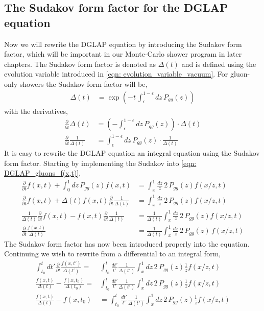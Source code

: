 \documentclass[main.tex]{subfiles}
\begin{document}
\subsection{The Sudakov form factor for the DGLAP equation}
Now we will rewrite the DGLAP equation by introducing the Sudakov form factor, which will be important in our Monte-Carlo shower program in later chapters. The Sudakov form factor is denoted as \(\Delta(t)\) and is defined using the evolution variable introduced in \autoref{eqn: evolution_variable_vacuum}. For gluon-only showers the Sudakov form factor will be, 
\begin{align}\label{eqn: sudakov_form_factor_dasguptalike}
    \Delta (t) &= \exp\left(-t\, \int_{\epsilon}^{1-\epsilon}dz \, P_{gg}(z)\right) 
\end{align}
with the derivatives,
\begin{align}
    \frac{\partial}{\partial t} \Delta (t) &= (- \int_{\epsilon}^{1-\epsilon} dz\, P_{gg}(z) )\cdot  \Delta(t) \nonumber\\
    \frac{\partial}{\partial t} \frac{1}{\Delta(t)}&= \int_{\epsilon}^{1-\epsilon} dz\, P_{gg}(z) \cdot  \frac{1}{\Delta(t)}
\end{align}
It is easy to rewrite the DGLAP equation an integral equation using the Sudakov form factor.
Starting by implementing the Sudakov into \autoref{eqn: DGLAP_gluons_f(x,t)},
\begin{align}
    \frac{\partial}{\partial t} f(x,t) + \int_{0}^{1} dz \, P_{gg}(z) f(x,t) &= \int_{x}^{1} \frac{dz}{z} \,2\, P_{gg}(z) f(x/z ,t) \nonumber \\
    \frac{\partial}{\partial t} f(x,t) + \Delta(t) f(x,t) \frac{\partial}{\partial t} \frac{1}{\Delta(t)} &= \int_{x}^{1} \frac{dz}{z} \,2\, P_{gg}(z) f(x/z ,t) \nonumber \\
    \frac{1}{\Delta(t)} \frac{\partial}{\partial t} f(x,t) - f(x,t) \frac{\partial}{\partial t} \frac{1}{\Delta(t)} &= \frac{1}{\Delta(t)} \int_{x}^{1} \frac{dz}{z} \,2\, P_{gg}(z) f(x/z ,t) \nonumber \\
    \frac{\partial }{\partial t} \frac{f(x,t)}{\Delta (t)} &= \frac{1}{\Delta(t)} \int_{x}^{1} \frac{dz}{z} \,2\, P_{gg}(z) \, f(x/z, t)
\end{align}
The Sudakov form factor has now been introduced properly into the equation. Continuing we wish to rewrite from a differential to an integral form,
\begin{align}
    \int_{t_0}^t dt' \frac{\partial}{\partial t} \frac{f(x,t')}{\Delta(t')} = &\int_{t_0}^{t} \frac{dt'}{t'} \frac{1}{\Delta(t')} \int_{x}^{1} dz \,2\, P_{gg}(z) \frac{1}{z} f(x/z, t) \nonumber\\
    \frac{f(x,t)}{\Delta(t)} - \frac{f(x,t_0)}{\Delta(t_0)} = &\int_{t_0}^{t} \frac{dt'}{t'} \frac{1}{\Delta(t')} \int_{x}^{1} dz \,2\, P_{gg}(z) \frac{1}{z} f(x/z, t) \nonumber\\
    \frac{f(x,t)}{\Delta(t)} - f(x,t_0) &= \int_{t_0}^{t} \frac{dt'}{t'} \frac{1}{\Delta(t')} \int_{x}^{1} dz  \,2\, P_{gg}(z) \frac{1}{z} f(x/z, t)
\end{align}
\end{document}
